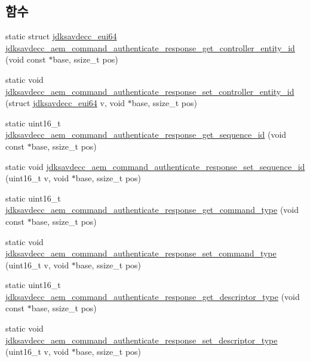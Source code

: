 \subsection*{함수}
\begin{DoxyCompactItemize}
\item 
static struct \hyperlink{structjdksavdecc__eui64}{jdksavdecc\+\_\+eui64} \hyperlink{group__command__authenticate__response_ga38d3412175fd13659e75643aef1ce4a1}{jdksavdecc\+\_\+aem\+\_\+command\+\_\+authenticate\+\_\+response\+\_\+get\+\_\+controller\+\_\+entity\+\_\+id} (void const $\ast$base, ssize\+\_\+t pos)
\item 
static void \hyperlink{group__command__authenticate__response_ga18d450627b33bc41c541161a2e9a6358}{jdksavdecc\+\_\+aem\+\_\+command\+\_\+authenticate\+\_\+response\+\_\+set\+\_\+controller\+\_\+entity\+\_\+id} (struct \hyperlink{structjdksavdecc__eui64}{jdksavdecc\+\_\+eui64} v, void $\ast$base, ssize\+\_\+t pos)
\item 
static uint16\+\_\+t \hyperlink{group__command__authenticate__response_ga709bf75d028fe4512a02749b7a7632d9}{jdksavdecc\+\_\+aem\+\_\+command\+\_\+authenticate\+\_\+response\+\_\+get\+\_\+sequence\+\_\+id} (void const $\ast$base, ssize\+\_\+t pos)
\item 
static void \hyperlink{group__command__authenticate__response_ga123b63abda4d0ffcfeac7caa193e82d5}{jdksavdecc\+\_\+aem\+\_\+command\+\_\+authenticate\+\_\+response\+\_\+set\+\_\+sequence\+\_\+id} (uint16\+\_\+t v, void $\ast$base, ssize\+\_\+t pos)
\item 
static uint16\+\_\+t \hyperlink{group__command__authenticate__response_ga9614a794be5b8035c401f39a25f15df7}{jdksavdecc\+\_\+aem\+\_\+command\+\_\+authenticate\+\_\+response\+\_\+get\+\_\+command\+\_\+type} (void const $\ast$base, ssize\+\_\+t pos)
\item 
static void \hyperlink{group__command__authenticate__response_ga315ad4d6673a286922695c49a1816fa0}{jdksavdecc\+\_\+aem\+\_\+command\+\_\+authenticate\+\_\+response\+\_\+set\+\_\+command\+\_\+type} (uint16\+\_\+t v, void $\ast$base, ssize\+\_\+t pos)
\item 
static uint16\+\_\+t \hyperlink{group__command__authenticate__response_gabcac7fea6ee242109e5dcfb9e831ebb7}{jdksavdecc\+\_\+aem\+\_\+command\+\_\+authenticate\+\_\+response\+\_\+get\+\_\+descriptor\+\_\+type} (void const $\ast$base, ssize\+\_\+t pos)
\item 
static void \hyperlink{group__command__authenticate__response_ga029163e6487aa262c99ef95f1363d1a1}{jdksavdecc\+\_\+aem\+\_\+command\+\_\+authenticate\+\_\+response\+\_\+set\+\_\+descriptor\+\_\+type} (uint16\+\_\+t v, void $\ast$base, ssize\+\_\+t pos)

\end{DoxyCompactItemize}
